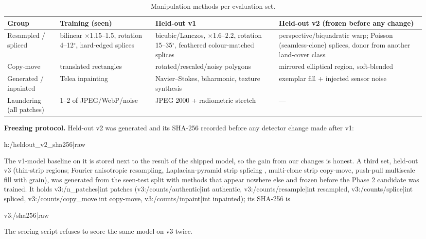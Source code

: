 \begin{table}[!htbp]
\centering\small
\begin{tabularx}{\textwidth}{|L{2.5cm}|Y|Y|Y|}
\hline
\textbf{Group} & \textbf{Training (seen)} & \textbf{Held-out v1} & \textbf{Held-out v2 (frozen before any change)}\\
\hline
Resampled / spliced & bilinear $\times$1.15--1.5, rotation 4--12$^\circ$, hard-edged splices & bicubic/Lanczos, $\times$1.6--2.2, rotation 15--35$^\circ$, feathered colour-matched splices & perspective/biquadratic warp; Poisson (seamless-clone) splices, donor from another land-cover class\\
\hline
Copy-move & translated rectangles & rotated/rescaled/noisy polygons & mirrored elliptical region, soft-blended\\
\hline
Generated / inpainted & Telea inpainting & Navier--Stokes, biharmonic, texture synthesis & exemplar fill + injected sensor noise\\
\hline
Laundering (all patches) & 1--2 of JPEG/WebP/noise & JPEG 2000 + radiometric stretch & ---\\
\hline
\end{tabularx}
\caption{Manipulation methods per evaluation set.}\label{tab:methods}
\end{table}

\textbf{Freezing protocol.} Held-out v2 was generated and its SHA-256 recorded before any detector change made after v1:
\begin{center}\ttfamily\footnotesize {{h:/heldout_v2_sha256|raw}}\end{center}
The v1-model baseline on it is stored next to the result of the shipped model, so the gain from our changes is honest. A third set, held-out v3 (thin-strip regions; Fourier anisotropic resampling, Laplacian-pyramid strip splicing \cite{burt}, multi-clone strip copy-move, push-pull multiscale fill with grain), was generated from the seen-test split with methods that appear nowhere else and frozen before the Phase 2 candidate was trained. It holds {{v3:/n_patches|int}} patches ({{v3:/counts/authentic|int}} authentic, {{v3:/counts/resample|int}} resampled, {{v3:/counts/splice|int}} spliced, {{v3:/counts/copy_move|int}} copy-move, {{v3:/counts/inpaint|int}} inpainted); its SHA-256 is
\begin{center}\ttfamily\footnotesize {{v3:/sha256|raw}}\end{center}
The scoring script refuses to score the same model on v3 twice.

